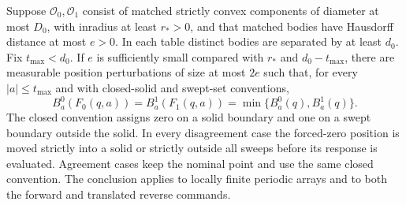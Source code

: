 \begin{lemma}\label{lem:common-response}
Suppose $\mathcal O_0,\mathcal O_1$ consist of matched strictly convex
components of diameter at most $D_0$, with inradius at least $r_*>0$,
and that matched bodies have Hausdorff distance at most $e>0$.
In each table distinct bodies are separated by at least $d_0$.
Fix $t_{\max}<d_0$. If $e$ is sufficiently small compared with
$r_*$ and $d_0-t_{\max}$, there are measurable position perturbations
of size at most $2e$ such that, for every $|a|\le t_{\max}$ and
with closed-solid and swept-set conventions,
\begin{equation}\label{eq:common-response}
 B^0_a(F_0(q,a))=B^1_a(F_1(q,a))
                    =\min\{B^0_a(q),B^1_a(q)\}.
\end{equation}
The closed convention assigns zero on a solid boundary and one on a
swept boundary outside the solid. In every disagreement case the
forced-zero position is moved strictly into a solid or strictly outside
all sweeps before its response is evaluated. Agreement cases keep the
nominal point and use the same closed convention. The conclusion
applies to locally finite periodic arrays and to both the forward and
translated reverse commands.
\end{lemma}
